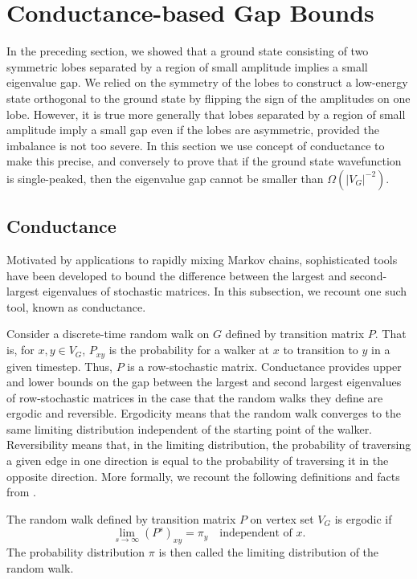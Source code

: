 \section{Conductance-based Gap Bounds}
\label{sec:conductance}

In the preceding section, we showed that a ground state consisting of
two symmetric lobes separated by a region of small amplitude implies a
small eigenvalue gap. We relied on the symmetry of the lobes to
construct a low-energy state orthogonal to the ground state by
flipping the sign of the amplitudes on one lobe. However, it is true
more generally that lobes separated by a region of small amplitude
imply a small gap even if the lobes are asymmetric, provided the
imbalance is not too severe. In this section we use concept of
conductance to make this precise, and conversely to prove that if the
ground state wavefunction is single-peaked, then the eigenvalue gap
cannot be smaller than $\Omega(|V_G|^{-2})$.

\subsection{Conductance}
\label{subsec:conductance}

Motivated by applications to rapidly mixing Markov chains,
sophisticated tools have been developed to bound the difference
between the largest and second-largest eigenvalues of stochastic 
matrices. In this subsection, we recount one such tool, known as
conductance.

Consider a discrete-time random walk on $G$ defined by transition
matrix $P$. That is, for $x,y \in V_G$, $P_{xy}$ is the
probability for a walker at $x$ to transition to $y$ in
a given timestep. Thus, $P$ is a row-stochastic matrix. Conductance
provides upper and lower bounds on the gap between the largest and
second largest eigenvalues of row-stochastic matrices in the case that
the random walks they define are ergodic and reversible. Ergodicity means
that the random walk converges to the same limiting distribution
independent of the starting point of the walker. Reversibility means
that, in the limiting distribution, the probability of traversing a
given edge in one direction is equal to the probability of traversing
it in the opposite direction. More formally, we recount the following
definitions and facts from \cite{Sinclair}.

\begin{definition}
The random walk defined by transition matrix $P$ on vertex set $V_G$
is ergodic if
\begin{equation}
\lim_{s \to \infty} \left( P^s \right)_{xy} = \pi_y \quad
\textrm{independent of $x$}.
\end{equation}
The probability distribution $\pi$ is then called the limiting
distribution of the random walk.
\end{definition}


